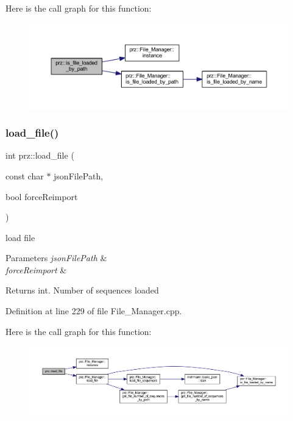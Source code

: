 Here is the call graph for this function\+:
\nopagebreak
\begin{figure}[H]
\begin{center}
\leavevmode
\includegraphics[width=350pt]{namespaceprz_a70392696dda40f3306dbc887daf79478_cgraph}
\end{center}
\end{figure}
\mbox{\label{namespaceprz_a53f06f7dabea7f0219ac751039a82e3c}} 
\subsubsection{\texorpdfstring{load\_file()}{load\_file()}}
{\footnotesize\ttfamily int prz\+::load\+\_\+file (\begin{DoxyParamCaption}\item[{const char $\ast$}]{json\+File\+Path,  }\item[{bool}]{force\+Reimport }\end{DoxyParamCaption})}



load file 


\begin{DoxyParams}{Parameters}
{\em json\+File\+Path} & \\
\hline
{\em force\+Reimport} & \\
\hline
\end{DoxyParams}
\begin{DoxyReturn}{Returns}
int. Number of sequences loaded 
\end{DoxyReturn}


Definition at line 229 of file File\+\_\+\+Manager.\+cpp.

Here is the call graph for this function\+:
\nopagebreak
\begin{figure}[H]
\begin{center}
\leavevmode
\includegraphics[width=350pt]{namespaceprz_a53f06f7dabea7f0219ac751039a82e3c_cgraph}
\end{center}
\end{figure}
\mbox{\label{namespaceprz_ad91b0a2618b7c9ce3a9bf792a3979e55}} 
